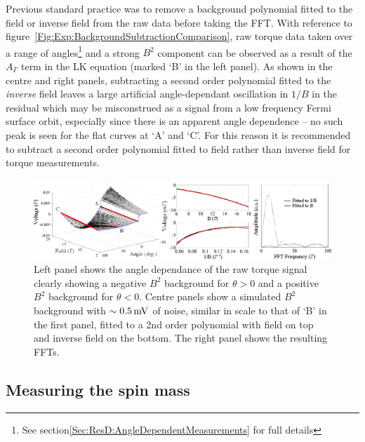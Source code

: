 Previous standard practice was to remove a background polynomial fitted to the field or inverse field from the raw data before taking the \ac{FFT}. With reference to figure~\ref{Fig:Exp:BackgroundSubtractionComparison}, raw torque data taken over a range of angles\footnote{See section\ref{Sec:ResD:AngleDependentMeasurements} for full details} and a strong $B^2$ component can be observed as a result of the $A_{\Gamma}$ term in the \ac{LK} equation (marked `B' in the left panel). As shown in the centre and right panels, subtracting a second order polynomial fitted to the \textit{inverse} field leaves a large artificial angle-dependant oscillation in $1/B$ in the residual which may be misconstrued as a signal from a low frequency Fermi surface orbit, especially since there is an apparent angle dependence -- no such peak is seen for the flat curves at `A' and `C'. For this reason it is recommended to subtract a second order polynomial fitted to field rather than inverse field for torque measurements.
\begin{figure}[h!]
    \begin{center}
        \includegraphics[scale=0.9]{Chapter-ExperimentalTechnique/Figures/ComparisonBackgroundSubtraction/ComparisonBackgroundSubtraction}
        \caption{Left panel shows the angle dependance of the raw torque signal  clearly showing a negative $B^2$ background for $\theta>0$ and a positive $B^2$ background for $\theta<0$. Centre panels show a simulated $B^2$ background with $\sim\unit[0.5]{mV}$ of noise, similar in scale to that of `B' in the first panel, fitted to a 2nd order polynomial with field on top and inverse field on the bottom. The right panel shows the resulting \ac{FFT}s.}
        \label{Fig:Exp:BackgroundSubtraction}
    \end{center}
\end{figure}

\subsection{Measuring the spin mass}


